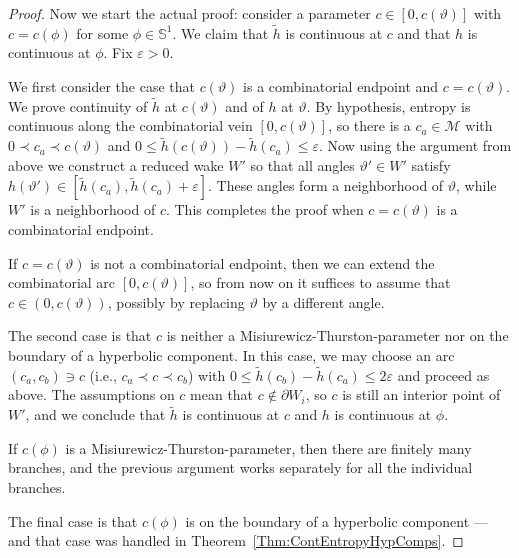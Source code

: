 \documentclass[12pt]{amsart}
\newcommand{\M}{\mathscr M}
\newcommand{\Circle}{\mathbb S^1}
\newcommand{\0}{\texttt{0}}
\newcommand{\1}{\texttt{1}}
\newcommand\eps{\varepsilon}
\theoremstyle{definition}
\numberwithin{equation}{section}
\renewcommand{\theta}{\vartheta}
\begin{document}
\begin{proof}
Now we start the actual proof: consider a parameter $c\in[0,c(\theta)]$ with $c=c(\phi)$ for some $\phi\in\Circle$. We claim that $\tilde h$ is continuous at $c$ and that $h$ is continuous at $\phi$. Fix $\eps>0$.

We first consider the case that $c(\theta)$ is a combinatorial endpoint and $c=c(\theta)$. We prove continuity of $\tilde h$ at $c(\theta)$ and of $h$ at $\theta$. By hypothesis, entropy is continuous along the combinatorial vein $[0,c(\theta)]$, so there is a $c_a\in\M$ with $0\prec c_a\prec c(\theta)$ and $0\le \tilde h(c(\theta)) -\tilde h(c_a) \le \eps$. Now using the argument from above we construct a reduced wake $W'$ so that all angles $\theta'\in W'$ satisfy $h(\theta')\in[\tilde h(c_a),\tilde h(c_a)+\eps]$.
These angles form a neighborhood of $\theta$, while $W'$ is a neighborhood of $c$. 
This completes the proof when $c=c(\theta)$ is a combinatorial endpoint.

If $c=c(\theta)$ is not a combinatorial endpoint, then we can extend the combinatorial arc $[0,c(\theta)]$, so from now on it suffices to assume that $c\in(0,c(\theta))$, possibly by replacing $\theta$ by a different angle.


The second case is that $c$ is neither a Misiurewicz-Thurston-parameter nor on the boundary of a hyperbolic component. In this case, we may choose an arc $(c_a,c_b)\ni c$ (i.e., $c_a\prec c\prec c_b$) with $0\le \tilde h(c_b)-\tilde h(c_a)\le 2\eps$ and proceed as above. The assumptions on $c$ mean that $c\not\in\partial W_i$, so $c$ is still an interior point of $W'$, and we conclude that $\tilde h$ is continuous at $c$ and $h$ is continuous at $\phi$. 

If $c(\phi)$ is a Misiurewicz-Thurston-parameter, then there are finitely many branches, and the previous argument works separately for all the individual branches. 

The final case is that $c(\phi)$ is on the boundary of a hyperbolic component --- and that case was handled in Theorem~\ref{Thm:ContEntropyHypComps}.
\end{proof}
\end{document}
